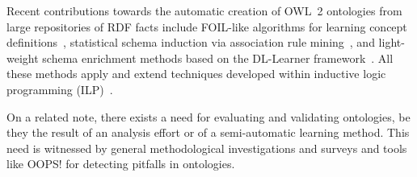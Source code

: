 \documentclass{llncs}
\begin{document}
Recent contributions towards the automatic creation of OWL~2 ontologies
from large repositories of RDF facts include
FOIL-like algorithms for learning concept definitions~\cite{FanizziDAmatoEsposito2008},
statistical schema induction via association rule mining~\cite{FleischhackerVoelkerStuckenschmidt2012},
and light-weight schema enrichment methods based on the DL-Learner
framework~\cite{HellmannLehmannAuer2009,BuehmannLehmann2012}.
All these methods apply and extend techniques developed within inductive logic programming
(ILP)~\cite{ILPat20}.

On a related note, there exists a need for evaluating and validating ontologies,
be they the result of an analysis effort or of a semi-automatic learning method.
This need is witnessed by general methodological investigations
\cite{GangemiCatenacciCiaramitaLehmann2005,GangemiCatenacciCiaramitaLehmann2006}
and surveys \cite{TartirBudakArpinarSheth2007} and tools like OOPS! \cite{PovedaSuarezGomez2012}
for detecting pitfalls in ontologies.


\end{document}
